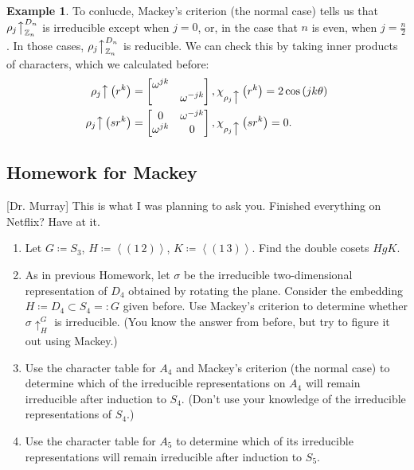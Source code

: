 \documentclass[12pt]{article}
\newcommand{\z}{\mathbb{Z}}
\newcommand\paren[1]{\left( #1 \right)}
\newcommand{\vbrack}[1]{\left \langle #1 \right \rangle}
\theoremstyle{definition}
\newtheorem{example}{Example}[section]
\begin{document}
\begin{example}
    To conlucde, Mackey's criterion (the normal case) tells us that $\rho_j \big\uparrow_{\z_n}^{D_n}$ is irreducible except when $j = 0$, or, in the case that $n$ is even, when $j = \frac{n}{2}$. In those cases, $\rho_j \big\uparrow_{\z_n}^{D_n}$ is reducible. We can check this by taking inner products of characters, which we calculated before:
    \begin{equation}
        \begin{split}
            \rho_j \big\uparrow \paren{ r^k } & = 
            \begin{bmatrix}
                \omega^{jk} & \\
                 & \omega^{-jk}
            \end{bmatrix},
            \chi_{\rho_j \big\uparrow} \paren{ r^k } = 2 \cos \paren{ jk \theta } \\
            \rho_j \big\uparrow \paren{ sr^k } & = 
            \begin{bmatrix}
                0 & \omega^{-jk} \\
                \omega^{jk} & 0
            \end{bmatrix},
            \chi_{\rho_j \big\uparrow} \paren{ sr^k } = 0.
        \end{split}
    \end{equation}
\end{example}
\subsection{Homework for Mackey}
{\color{blue} 
[Dr. Murray] This is what I was planning to ask you. Finished everything on Netflix? Have at it.
}
\begin{enumerate}
    \item Let $G \coloneqq  S_3$, $H \coloneqq  \vbrack{(1\,2)}$, $K \coloneqq  \vbrack{(1\,3)}$. Find the double cosets $HgK$.
    \item As in previous Homework, let $\sigma$ be the irreducible two-dimensional representation of $D_4$ obtained by rotating the plane. Consider the embedding $H \coloneqq  D_4 \subset S_4 =: G$ given before. Use Mackey's criterion to determine whether $\sigma \uparrow_H^G$ is irreducible. (You know the answer from before, but try to figure it out using Mackey.)
    \item Use the character table for $A_4$ and Mackey's criterion (the normal case) to determine which of the irreducible representations on $A_4$ will remain irreducible after induction to $S_4$. (Don't use your knowledge of the irreducible representations of $S_4$.)
    \item Use the character table for $A_5$ to determine which of its irreducible representations will remain irreducible after induction to $S_5$.
\end{enumerate}
\end{document}
